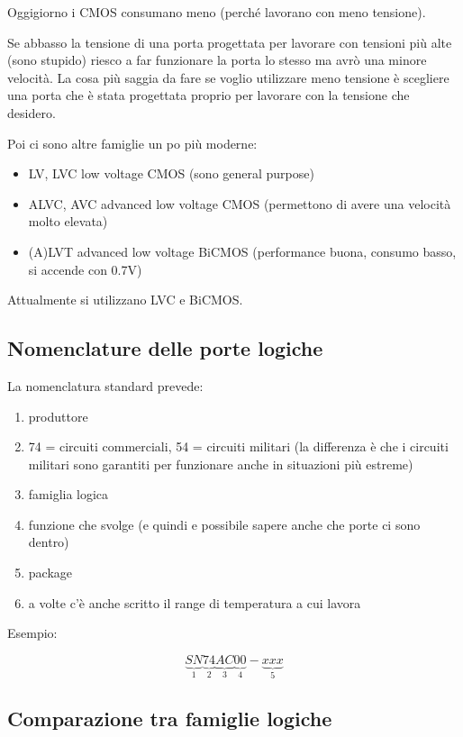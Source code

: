 \documentclass[
]{book}
\providecommand{\tightlist}{%
  \setlength{\itemsep}{0pt}\setlength{\parskip}{0pt}}
\begin{document}
Oggigiorno i CMOS consumano meno (perché lavorano con meno tensione).

Se abbasso la tensione di una porta progettata per lavorare con tensioni
più alte (sono stupido) riesco a far funzionare la porta lo stesso ma
avrò una minore velocità. La cosa più saggia da fare se voglio
utilizzare meno tensione è scegliere una porta che è stata progettata
proprio per lavorare con la tensione che desidero.

Poi ci sono altre famiglie un po più moderne:

\begin{itemize}
\tightlist
\item
  LV, LVC low voltage CMOS (sono general purpose)
\item
  ALVC, AVC advanced low voltage CMOS (permettono di avere una velocità
  molto elevata)
\item
  (A)LVT advanced low voltage BiCMOS (performance buona, consumo basso,
  si accende con 0.7V)
\end{itemize}

Attualmente si utilizzano LVC e BiCMOS.

\subsection{Nomenclature delle porte
logiche}\label{nomenclature-delle-porte-logiche}

La nomenclatura standard prevede:

\begin{enumerate}
\def\labelenumi{\arabic{enumi}.}
\tightlist
\item
  produttore
\item
  74 = circuiti commerciali, 54 = circuiti militari (la differenza è che
  i circuiti militari sono garantiti per funzionare anche in situazioni
  più estreme)
\item
  famiglia logica
\item
  funzione che svolge (e quindi e possibile sapere anche che porte ci
  sono dentro)
\item
  package
\item
  a volte c'è anche scritto il range di temperatura a cui lavora
\end{enumerate}

Esempio:

\[\underbrace{SN}_{1}\underbrace{74}_{2}\underbrace{AC}_{3}\underbrace{00}_{4}-
\underbrace{xxx}_{5}\]

\subsection{Comparazione tra famiglie
logiche}\label{comparazione-tra-famiglie-logiche}
\end{document}
